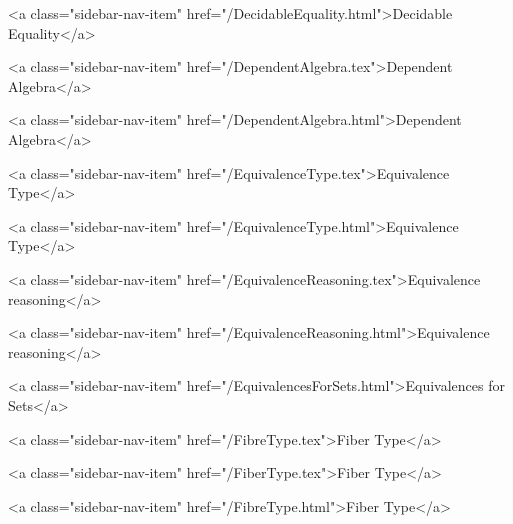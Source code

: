       
        
          <a class="sidebar-nav-item" href="/DecidableEquality.html">Decidable Equality</a>
        
      
    
      
        
          <a class="sidebar-nav-item" href="/DependentAlgebra.tex">Dependent Algebra</a>
        
      
    
      
        
          <a class="sidebar-nav-item" href="/DependentAlgebra.html">Dependent Algebra</a>
        
      
    
      
        
          <a class="sidebar-nav-item" href="/EquivalenceType.tex">Equivalence Type</a>
        
      
    
      
        
          <a class="sidebar-nav-item" href="/EquivalenceType.html">Equivalence Type</a>
        
      
    
      
        
          <a class="sidebar-nav-item" href="/EquivalenceReasoning.tex">Equivalence reasoning</a>
        
      
    
      
        
          <a class="sidebar-nav-item" href="/EquivalenceReasoning.html">Equivalence reasoning</a>
        
      
    
      
        
          <a class="sidebar-nav-item" href="/EquivalencesForSets.html">Equivalences for Sets</a>
        
      
    
      
        
          <a class="sidebar-nav-item" href="/FibreType.tex">Fiber Type</a>
        
      
    
      
        
          <a class="sidebar-nav-item" href="/FiberType.tex">Fiber Type</a>
        
      
    
      
        
          <a class="sidebar-nav-item" href="/FibreType.html">Fiber Type</a>
        
